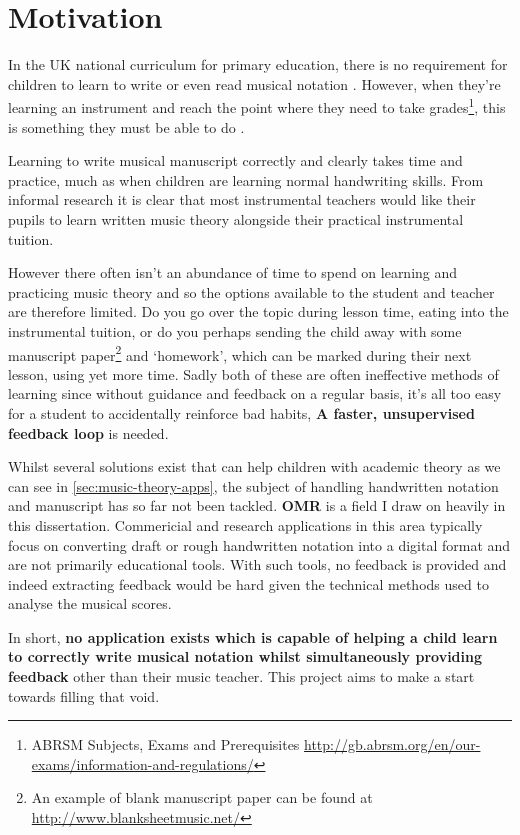\section{Motivation}

In the UK national curriculum for primary education, there is no requirement for children to learn to write or even read musical notation \parencite{Attai5}. However, when they're learning an instrument and reach the point where they need to take grades\footnote{ABRSM Subjects, Exams and Prerequisites \url{http://gb.abrsm.org/en/our-exams/information-and-regulations/}}, this is something they must be able to do \parencite{whyMusicTheory}.

Learning to write musical manuscript correctly and clearly takes time and practice, much as when children are learning normal handwriting skills. From informal research it is clear that most instrumental teachers would like their pupils to learn written music theory alongside their practical instrumental tuition.

However there often isn't an abundance of time to spend on learning and practicing music theory and so the options available to the student and teacher are therefore limited. Do you go over the topic during lesson time, eating into the instrumental tuition, or do you perhaps sending the child away with some manuscript paper\footnote{An example of blank manuscript paper can be found at \url{http://www.blanksheetmusic.net/}} and `homework', which can be marked during their next lesson, using yet more time. Sadly both of these are often ineffective methods of learning since without guidance and feedback on a regular basis, it's all too easy for a student to accidentally reinforce bad habits, \textbf{A faster, unsupervised feedback loop} is needed.

Whilst several solutions exist that can help children with academic theory as we can see in \cref{sec:music-theory-apps}, the subject of handling handwritten notation and manuscript has so far not been tackled. \textbf{\acrfull{OMR}} is a field I draw on heavily in this dissertation. Commericial and research applications in this area typically focus on converting draft or rough handwritten notation into a digital format and are not primarily educational tools. With such tools, no feedback is provided and indeed extracting feedback would be hard given the technical methods used to analyse the musical scores.

In short, \textbf{no application exists which is capable of helping a child learn to correctly write musical notation whilst simultaneously providing feedback} other than their music teacher. This project aims to make a start towards filling that void.